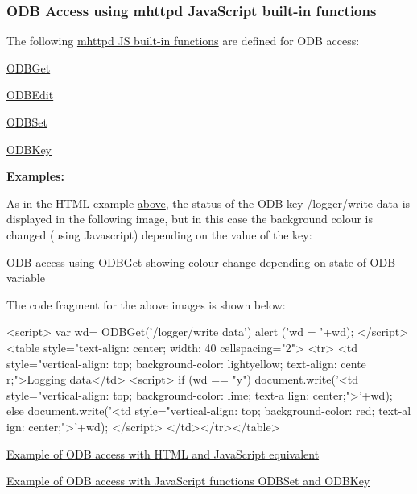 \par
\hypertarget{RC_mhttpd_custom_ODB_access_RC_mhttpd_custom_odb_js}{}\subsubsection{ODB Access using mhttpd JavaScript built-\/in functions}\label{RC_mhttpd_custom_ODB_access_RC_mhttpd_custom_odb_js}
The following \hyperlink{RC_mhttpd_custom_js_lib}{mhttpd JS built-\/in functions} are defined for ODB access:
\begin{DoxyItemize}
\item \hyperlink{RC_mhttpd_custom_ODB_access_RC_mhttpd_custom_odbget}{ODBGet}
\item \hyperlink{RC_mhttpd_custom_ODB_access_RC_mhttpd_custom_odbedit}{ODBEdit}
\item \hyperlink{RC_mhttpd_custom_ODB_access_RC_mhttpd_custom_odbset}{ODBSet}
\item \hyperlink{RC_mhttpd_custom_ODB_access_RC_mhttpd_custom_odbkey}{ODBKey}
\end{DoxyItemize}

{\bfseries Examples:} 
\begin{DoxyEnumerate}
\item As in the HTML example \hyperlink{RC_mhttpd_custom_ODB_access_odb_tag_ex1}{above}, the status of the ODB key /logger/write data is displayed in the following image, but in this case the background colour is changed (using Javascript) depending on the value of the key:

\begin{center} ODB access using ODBGet showing colour change depending on state of ODB variable  \par
  \end{center}  \par
 The code fragment for the above images is shown below: 
\begin{DoxyCode}
<script>
var wd= ODBGet('/logger/write data')
alert ('wd = '+wd);
</script>
<table style="text-align: center; width: 40%
cellspacing="2">
<tr>
<td style="vertical-align: top; background-color:  lightyellow; text-align: cente
      r;">Logging data</td>
<script>
if (wd == "y")
   document.write('<td style="vertical-align: top; background-color: lime; text-a
      lign: center;">'+wd);
else
   document.write('<td style="vertical-align: top; background-color: red; text-al
      ign: center;">'+wd);
</script>
</td></tr></table>
\end{DoxyCode}



\item \hyperlink{RC_mhttpd_custom_ODB_access_examples_RC_mhttpd_js_example1}{Example of ODB access with HTML and JavaScript equivalent} 
\item \hyperlink{RC_mhttpd_custom_ODB_access_examples_RC_mhttpd_js_example2}{Example of ODB access with JavaScript functions ODBSet and ODBKey} 
\end{DoxyEnumerate}

